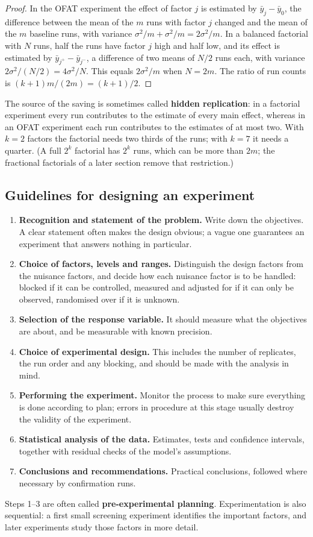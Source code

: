 \documentclass[11pt,a4paper]{article}
\numberwithin{equation}{section}
\theoremstyle{definition}
\begin{document}
\begin{proof}
In the OFAT experiment the effect of factor $j$ is estimated by $\bar y_j - \bar y_0$, the difference between the mean of the $m$ runs with factor $j$
changed and the mean of the $m$ baseline runs, with variance $\sigma^2/m + \sigma^2/m = 2\sigma^2/m$. In a balanced factorial with $N$ runs, half the runs
have factor $j$ high and half low, and its effect is estimated by $\bar y_{j^+} - \bar y_{j^-}$, a difference of two means of $N/2$ runs each, with
variance $2\sigma^2/(N/2) = 4\sigma^2/N$. This equals $2\sigma^2/m$ when $N = 2m$. The ratio of run counts is $(k + 1)m/(2m) = (k + 1)/2$.
\end{proof}

The source of the saving is sometimes called \textbf{hidden replication}: in a factorial experiment every run contributes to the estimate of every
main effect, whereas in an OFAT experiment each run contributes to the estimates of at most two. With $k = 2$ factors the factorial needs two thirds
of the runs; with $k = 7$ it needs a quarter. (A full $2^k$ factorial has $2^k$ runs, which can be more than $2m$; the fractional factorials of a later
section remove that restriction.)

\subsection{Guidelines for designing an experiment}
\begin{enumerate}
\item \textbf{Recognition and statement of the problem.} Write down the objectives. A clear statement often makes the design obvious; a vague one
guarantees an experiment that answers nothing in particular.
\item \textbf{Choice of factors, levels and ranges.} Distinguish the design factors from the nuisance factors, and decide how each nuisance factor is to
be handled: blocked if it can be controlled, measured and adjusted for if it can only be observed, randomised over if it is unknown.
\item \textbf{Selection of the response variable.} It should measure what the objectives are about, and be measurable with known precision.
\item \textbf{Choice of experimental design.} This includes the number of replicates, the run order and any blocking, and should be made with the
analysis in mind.
\item \textbf{Performing the experiment.} Monitor the process to make sure everything is done according to plan; errors in procedure at this
stage usually destroy the validity of the experiment.
\item \textbf{Statistical analysis of the data.} Estimates, tests and confidence intervals, together with residual checks of the model's
assumptions.
\item \textbf{Conclusions and recommendations.} Practical conclusions, followed where necessary by confirmation runs.
\end{enumerate}
Steps 1--3 are often called \textbf{pre-experimental planning}. Experimentation is also sequential: a first small screening experiment identifies
the important factors, and later experiments study those factors in more detail.
\end{document}
